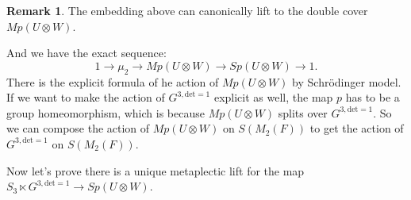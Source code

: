 \documentclass[12pt,a4paper,english]{article}
\theoremstyle{plain}
\theoremstyle{definition}
\newtheorem*{rem}{Remark}
\begin{document}
\begin{rem}
The embedding above can canonically lift to the double cover $Mp(U\otimes W)$.
\begin{center}
\end{center}
And we have the exact sequence:
\begin{equation*}
    1\rightarrow \mu_{2}\rightarrow Mp(U\otimes W)\rightarrow Sp(U\otimes W)\rightarrow 1.
\end{equation*} 
There is the explicit formula of he action of $Mp(U\otimes W)$ by Schr\"{o}dinger model. If we want to make the action of $G^{3 ,\text{det}=1}$ explicit as well, the map $p$ has to be a group homeomorphism, which is because $Mp(U\otimes W)$ splits over $G^{3, \text{det}=1}$. So we can compose the action of $Mp(U\otimes W)$ on $S(M_{2}(F))$ to get the action of $G^{3, \text{det}=1}$ on $S(M_{2}(F))$.


\end{rem}
Now let's prove there is a unique metaplectic lift for the map $S_{3}\ltimes G^{3, \text{det}=1}\rightarrow Sp(U\otimes W)$.
\end{document}
